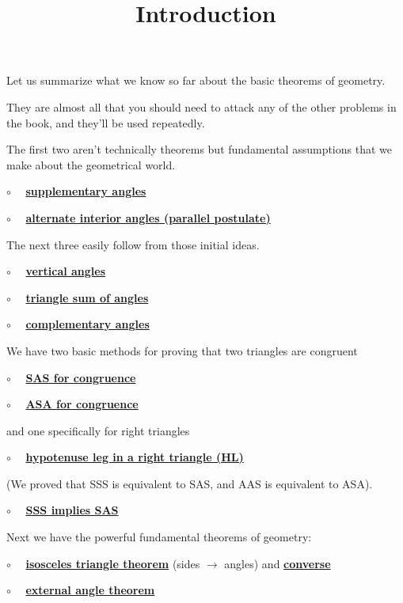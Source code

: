 \documentclass[11pt, oneside]{article}
\title{Introduction}
\date{}
\begin{document}
\maketitle
\Large


Let us summarize what we know so far about the basic theorems of geometry.  

They are almost all that you should need to attack any of the other problems in the book, and they'll be used repeatedly.

The first two aren't technically theorems but fundamental assumptions that we make about the geometrical world.

$\circ$ \ \ \hyperref[sec:supplementary_angle_theorem]{\textbf{supplementary angles}}

$\circ$ \ \  \hyperref[sec:alternate_interior_angle_theorem]{\textbf{alternate interior angles (parallel postulate)}}

The next three easily follow from those initial ideas.

$\circ$ \ \ \hyperref[sec:vertical_angle_theorem]{\textbf{vertical angles}}

$\circ$ \ \  \hyperref[sec:triangle_sum_theorem]{\textbf{triangle sum of angles}}

$\circ$ \ \ \hyperref[sec:complementary_angle_theorem]{\textbf{complementary angles}}

We have two basic methods for proving that two triangles are congruent

$\circ$ \ \ \hyperref[sec:SAS]{\textbf{SAS for congruence}}

$\circ$ \ \ \hyperref[sec:ASA]{\textbf{ASA for congruence}}

and one specifically for right triangles

$\circ$ \ \ \hyperref[sec:SSA_in_right]{\textbf{hypotenuse leg in a right triangle (HL)}}

(We proved that SSS is equivalent to SAS, and AAS is equivalent to ASA).

$\circ$ \ \ \hyperref[sec:SSS_implies_SAS]{\textbf{SSS implies SAS}}

Next we have the powerful fundamental theorems of geometry:

$\circ$ \ \  \hyperref[sec:isosceles_triangle_theorem]{\textbf{isosceles triangle theorem}} (sides $\rightarrow$ angles) and \hyperref[sec:isosceles_converse]{\textbf{converse}}

$\circ$ \ \ \hyperref[sec:external_angle_theorem]{\textbf{external angle theorem}}
\end{document}
